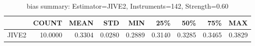 \begin{table}[ht]
\centering
\caption{bias summary: Estimator=JIVE2, Instruments=142, Strength=0.60}
\begin{tabular}{lrrrrrrrr}
\toprule
 & COUNT & MEAN & STD & MIN & 25\% & 50\% & 75\% & MAX \\
\midrule
JIVE2 & 10.0000 & 0.3304 & 0.0280 & 0.2889 & 0.3140 & 0.3285 & 0.3465 & 0.3829 \\
\bottomrule
\end{tabular}
\end{table}
